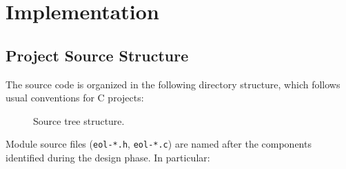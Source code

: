 
\chapter{Implementation}


\section{Project Source Structure}

The \Eol* source code is organized in the following directory structure, which
follows usual conventions for C projects:

\begin{figure}[h]
    \centering
    \noindent\begin{minipage}{0.75\textwidth}
    \end{minipage}
    \caption{Source tree structure.}
\end{figure}

Module source files (\verb|eol-*.h|, \verb|eol-*.c|) are named after the
components identified during the design phase. In particular:

